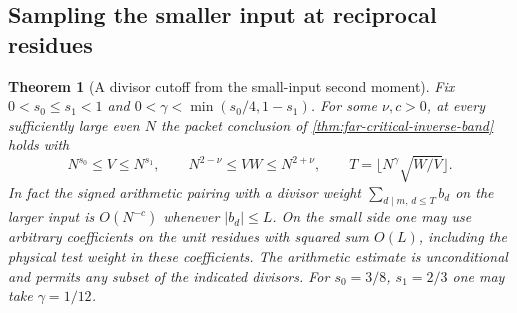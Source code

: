 \documentclass[11pt,a4paper]{article}
\numberwithin{equation}{section}
\newtheorem{theorem}{Theorem}[section]
\begin{document}
\subsection{Sampling the smaller input at reciprocal residues}

\begin{theorem}[A divisor cutoff from the small-input second moment]
\label{thm:critical-reciprocal-sampling}
Fix $0<s_0\le s_1<1$ and
$0<\gamma<\min(s_0/4,1-s_1)$. For some $\nu,c>0$, at every
sufficiently large even $N$ the packet conclusion of
\cref{thm:far-critical-inverse-band} holds with
\[
 N^{s_0}\le V\le N^{s_1},\qquad
 N^{2-\nu}\le VW\le N^{2+\nu},\qquad
 T=\lfloor N^\gamma\sqrt{W/V}\rfloor.
\]
In fact the signed arithmetic pairing with a divisor weight
$\sum_{d\mid m,\,d\le T}b_d$ on the larger input is $O(N^{-c})$
whenever $|b_d|\le L$. On the small side one may use arbitrary
coefficients on the unit residues with squared sum $O(L)$,
including the physical test weight in these coefficients.
The arithmetic estimate is unconditional and permits any subset
of the indicated divisors. For $s_0=3/8$, $s_1=2/3$ one may
take $\gamma=1/12$.
\end{theorem}
\end{document}
